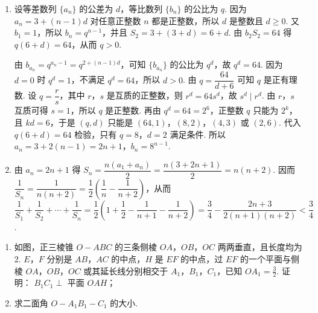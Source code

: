 \begin{solution}
\begin{enumerate}
\item 设等差数列 \(\{a_n\}\) 的公差为 \(d\)，等比数列 \(\{b_n\}\) 的公比为 \(q\). 因为 \(a_n=3+(n-1)d\) 对任意正整数 \(n\) 都是正整数，所以 \(d\) 是整数且 \(d\geqslant0\). 又 \(b_1=1\)，所以 \(b_n=q^{n-1}\)，并且 \(S_2=3+(3+d)=6+d\). 由 \(b_2S_2=64\) 得 \(q(6+d)=64\)，从而 \(q>0\).

由 \(b_{a_n}=q^{a_n-1}=q^{2+(n-1)d}\)，可知 \(\{b_{a_n}\}\) 的公比为 \(q^d\)，故 \(q^d=64\). 因为 \(d=0\) 时 \(q^d=1\)，不满足 \(q^d=64\)，所以 \(d>0\). 由 \(q=\dfrac{64}{d+6}\) 可知 \(q\) 是正有理数. 设 \(q=\dfrac{r}{s}\)，其中 \(r\)，\(s\) 是互质的正整数，则 \(r^d=64s^d\)，故 \(s^d\mid r^d\). 由 \(r\)，\(s\) 互质可得 \(s=1\)，所以 \(q\) 是正整数. 再由 \(q^d=64=2^6\)，正整数 \(q\) 只能为 \(2^k\)，且 \(kd=6\)，于是 \((q,d)\) 只能是 \((64,1)\)，\((8,2)\)，\((4,3)\) 或 \((2,6)\). 代入 \(q(6+d)=64\) 检验，只有 \(q=8\)，\(d=2\) 满足条件. 所以 \(a_n=3+2(n-1)=2n+1\)，\(b_n=8^{n-1}\).

\item 由 \(a_n=2n+1\) 得
\(S_n=\dfrac{n\left(a_1+a_n\right)}{2}=\dfrac{n(3+2n+1)}{2}=n(n+2)\). 因而
\(\dfrac{1}{S_n}=\dfrac{1}{n(n+2)}=\dfrac{1}{2}\left(\dfrac{1}{n}-\dfrac{1}{n+2}\right)\)，从而
\(\dfrac{1}{S_1}+\dfrac{1}{S_2}+\cdots+\dfrac{1}{S_n}=\dfrac{1}{2}\left(1+\dfrac{1}{2}-\dfrac{1}{n+1}-\dfrac{1}{n+2}\right)=\dfrac{3}{4}-\dfrac{2n+3}{2(n+1)(n+2)}<\dfrac{3}{4}\).
\end{enumerate}
\end{solution}

\begin{problem}
\begin{enumerate}
\item 如图，正三棱锥 \(O - ABC\) 的三条侧棱 \(OA\)，\(OB\)，\(OC\) 两两垂直，且长度均为 \(2\). \(E\)，\(F\) 分别是 \(AB\)，\(AC\) 的中点，\(H\) 是 \(EF\) 的中点，过 \(EF\) 的一个平面与侧棱 \(OA\)，\(OB\)，\(OC\) 或其延长线分别相交于 \(A_{1}\)，\(B_{1}\)，\(C_{1}\)，已知 \(OA_{1} = \frac{3}{2}\). 证明： \(B_{1}C_{1}\perp\) 平面 \(OAH\)；
\item 求二面角 \( O - A_{1}B_{1} - C_{1} \) 的大小.
\end{enumerate}
\end{problem}

